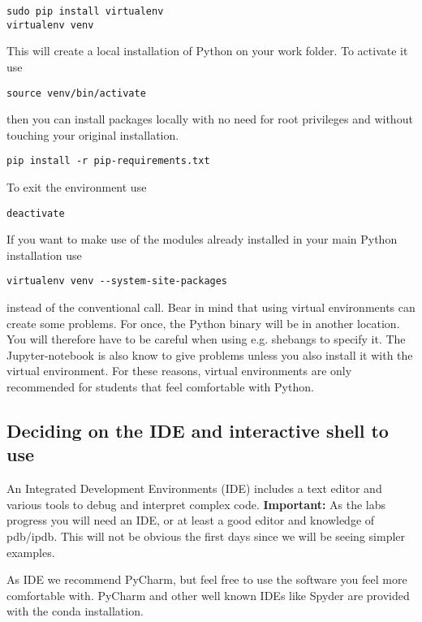 \begin{verbatim}
sudo pip install virtualenv
virtualenv venv 
\end{verbatim}

\noindent This will create a local installation of Python on your work folder. To
activate it use 

\begin{verbatim}
source venv/bin/activate
\end{verbatim}

\noindent then you can install packages locally with no need for root privileges and without touching your original installation.

\begin{verbatim}
pip install -r pip-requirements.txt
\end{verbatim}

\noindent To exit the environment use 

\begin{verbatim}
deactivate
\end{verbatim}

\noindent If you want to make use of the modules already installed in your main Python installation use

\begin{verbatim}
virtualenv venv --system-site-packages
\end{verbatim}

instead of the conventional call. Bear in mind that using virtual environments can create some problems. For once, the Python binary will be in another location. You will therefore have to be careful when using e.g. shebangs to specify it. The Jupyter-notebook is also know to give problems unless you also install it with the virtual environment. For these reasons, virtual environments are only recommended for students that feel comfortable with Python. 

\subsection{Deciding on the IDE and interactive shell to use}

An Integrated Development Environments (IDE) includes a text editor and various tools to debug and interpret complex code. \textbf{Important:} As the labs progress you will need an IDE, or at least a good editor and knowledge of pdb/ipdb. This will not be obvious the first days since we will be seeing simpler examples.

As IDE we recommend PyCharm, but feel free to use the software you feel more comfortable with. PyCharm and other well known IDEs like Spyder are provided with the conda installation.

